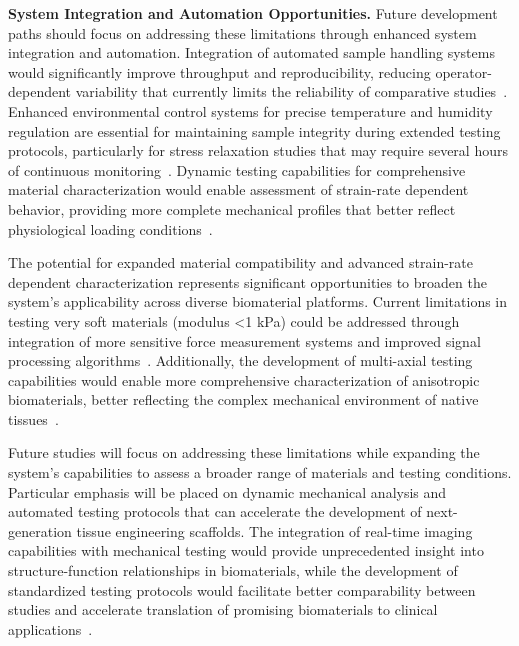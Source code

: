\textbf{System Integration and Automation Opportunities.} Future development paths should focus on addressing these limitations through enhanced system integration and automation. Integration of automated sample handling systems would significantly improve throughput and reproducibility, reducing operator-dependent variability that currently limits the reliability of comparative studies~\cite{patel2019systematicreview}. Enhanced environmental control systems for precise temperature and humidity regulation are essential for maintaining sample integrity during extended testing protocols, particularly for stress relaxation studies that may require several hours of continuous monitoring~\cite{schinagl1997depthdependentconfined, schinagl1996videomicroscopy}. Dynamic testing capabilities for comprehensive material characterization would enable assessment of strain-rate dependent behavior, providing more complete mechanical profiles that better reflect physiological loading conditions~\cite{korhonen2002comparisonequilibrium}.

The potential for expanded material compatibility and advanced strain-rate dependent characterization represents significant opportunities to broaden the system's applicability across diverse biomaterial platforms. Current limitations in testing very soft materials (modulus <1 kPa) could be addressed through integration of more sensitive force measurement systems and improved signal processing algorithms~\cite{antoine2014review, nichol2010cellviability}. Additionally, the development of multi-axial testing capabilities would enable more comprehensive characterization of anisotropic biomaterials, better reflecting the complex mechanical environment of native tissues~\cite{seitz2013stressrelaxationresponse}.

Future studies will focus on addressing these limitations while expanding the system's capabilities to assess a broader range of materials and testing conditions. Particular emphasis will be placed on dynamic mechanical analysis and automated testing protocols that can accelerate the development of next-generation tissue engineering scaffolds. The integration of real-time imaging capabilities with mechanical testing would provide unprecedented insight into structure-function relationships in biomaterials, while the development of standardized testing protocols would facilitate better comparability between studies and accelerate translation of promising biomaterials to clinical applications~\cite{patel2019systematicreview, chaudhuri2016hydrogelstunable}.

